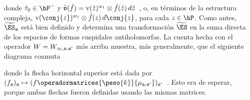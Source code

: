 %
donde $\tilde{\tau}_{0}\in\hP^{-}$ y
\begin{math}
	\tilde{\frak{v}}(\tilde{f})=\mathrm{v}(\tilde{z})^{w_{1}}\otimes
		\tilde{f}(\tilde{z})\,d\tilde{z}
\end{math}~,
o, en t\'{e}rminos de la estructura compleja,
$\mathrm{v}(\conj{z})^{w_{1}}\otimes\tilde{f}(z)\,d\conj{z}$, para cada
$z\in\hP$. Como antes, $\widetilde{\ES}_{\frak{a}}$ est\'{a} bien definido y
determina una transformaci\'{o}n $\widetilde{\ES}$ en la suma directa de los
espacios de formas cuspidales antiholomorfas. La cuenta hecha con el operador
$W=W_{\infty,\frak{a},\frak{a}'}$ m\'{a}s arriba muestra, m\'{a}s generalmente,
que el siguiente diagrama conmuta
\begin{center}
\end{center}
donde la flecha horizontal superior est\'{a} dada por
\begin{math}
	(f_{\frak{a}})_{\frak{a}}\mapsto (f\operadormatrices{\peso{k}}{%
		\mu_{\frak{a},\frak{a}'}})_{\frak{a}'}
\end{math}~.
Esto era de esperar, porque ambas flechas fueron definidas usando las mismas
matrices.

